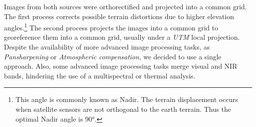 Images from both sources were orthorectified and projected into a common grid. The first process corrects
possible terrain distortions due to higher elevation angles.\footnote{This angle is commonly known as Nadir.
The terrain displacement occurs when satellite sensors are not orthogonal to the earth terrain. Thus the optimal
Nadir angle is \ang{90}.} The second process projects the images into a common grid to georeference them into 
a common grid, usually under a \textit{UTM} local projection. Despite the availability of more advanced image 
processing tasks, as \textit{Pansharpening} or \textit{Atmospheric compensation}, we decided to use a single approach. 
Also, some advanced image processing tasks merge visual and NIR bands, hindering the use of a multispectral 
or thermal analysis. 


